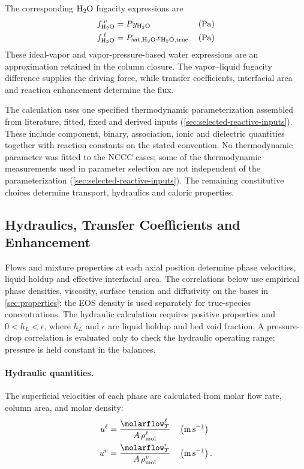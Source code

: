 The corresponding $\HtwoO$ fugacity expressions are
\begin{align}
f^{\:\vap}_{ \HtwoO} &= P y_{\HtwoO} && \left(\unit{Pa} \right)\\
f^{\:\liq}_{ \HtwoO} &= P_{\text{sat}, \HtwoO} x_{\HtwoO, \text{true}} && \left(\unit{Pa} \right)
\end{align}
These ideal-vapor and vapor-pressure-based water expressions are an approximation retained in the column closure.
The vapor--liquid fugacity difference supplies the driving force, while transfer coefficients, interfacial area and reaction enhancement determine the flux.

The calculation uses one specified thermodynamic parameterization assembled from literature, fitted, fixed and derived inputs (\cref{sec:selected-reactive-inputs}).
These include component, binary, association, ionic and dielectric quantities together with reaction constants on the stated convention.
No thermodynamic parameter was fitted to the NCCC cases; some of the thermodynamic measurements used in parameter selection are not independent of the parameterization (\cref{sec:selected-reactive-inputs}).
The remaining constitutive choices determine transport, hydraulics and caloric properties.

\subsection{Hydraulics, Transfer Coefficients and Enhancement}\label{subsec:transport}
Flows and mixture properties at each axial position determine phase velocities, liquid holdup and effective interfacial area.
The correlations below use empirical phase densities, viscosity, surface tension and diffusivity on the bases in \cref{sec:properties}; the EOS density is used separately for true-species concentrations.
The hydraulic calculation requires positive properties and $0<h_L<\epsilon$, where $h_L$ and $\epsilon$ are liquid holdup and bed void fraction.
A pressure-drop correlation is evaluated only to check the hydraulic operating range; pressure is held constant in the balances.


\paragraph{Hydraulic quantities.}
The superficial velocities of each phase are calculated from molar flow rate, column area, and molar density:
\begin{align}
u^{\liq} &= \frac{\molarflow^{\liq}_{T}}{A \,\rho^{\liq}_{ \text{mol}}}
&& \left(\unit{m\,s^{-1}}\right)\\
u^{\vap} &= \frac{\molarflow^{\vap}_{T}}{A \,\rho^{\vap}_{ \text{mol}}}
&& \left(\unit{m\,s^{-1}}\right).
\end{align}


